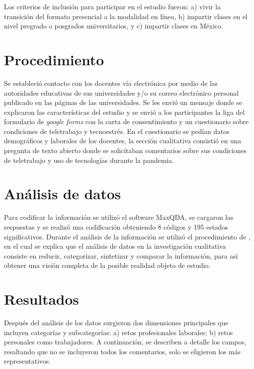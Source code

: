 \documentclass[spanish]{textolivre}
\begin{document}
Los criterios de inclusión para participar en el estudio fueron: a) vivir la transición del formato presencial a la modalidad en línea, b) impartir clases en el nivel pregrado o posgrados universitarios, y c) impartir clases en México.


\section{Procedimiento}

Se estableció contacto con los docentes vía electrónica por medio de las autoridades educativas de sus universidades y/o su correo electrónico personal publicado en las páginas de las universidades. Se les envió un mensaje donde se explicaron las características del estudio y se envió a los participantes la liga del formulario de \emph{google forms} con la carta de consentimiento y un cuestionario sobre condiciones de teletrabajo y tecnoestrés. En el cuestionario se pedían datos demográficos y laborales de los docentes, la sección cualitativa consistió en una pregunta de texto abierto donde se solicitaban comentarios sobre sus condiciones de teletrabajo y uso de tecnologías durante la pandemia.

\section{Análisis de datos}

Para codificar la información se utilizó el software MaxQDA, se cargaron las respuestas y se realizó una codificación obteniendo 8 códigos y 195 estados significativos. Durante el análisis de la información se utilizó el procedimiento de \textcite{perez_serrano_investigacion_1994}, en el cual se explica que el análisis de datos en la investigación cualitativa consiste en reducir, categorizar, sintetizar y comparar la información, para así obtener una visión completa de la posible realidad objeto de estudio.


\section{Resultados}

Después del análisis de los datos surgieron dos dimensiones principales que incluyen categorías y subcategorías: a) retos profesionales laborales; b) retos personales como trabajadores. A continuación, se describen a detalle los campos, resaltando que no se incluyeron todos los comentarios, solo se eligieron los más representativos.
\end{document}
